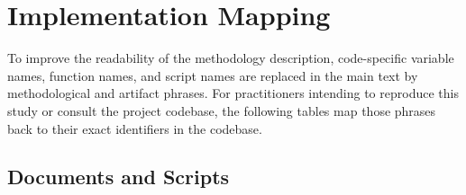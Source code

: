 \appendix
\section{Implementation Mapping}
\label{app:implementation_mapping}

To improve the readability of the methodology description, code-specific variable names, function names, and script names are replaced in the main text by methodological and artifact phrases. For practitioners intending to reproduce this study or consult the project codebase, the following tables map those phrases back to their exact identifiers in the codebase.

\subsection{Documents and Scripts}

